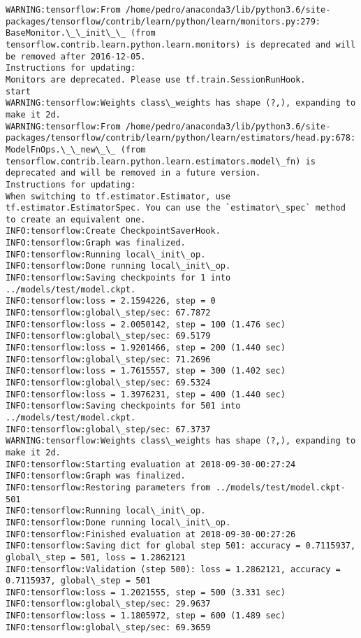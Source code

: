 \documentclass[11pt]{article}
\begin{document}
    \begin{Verbatim}[commandchars=\\\{\}]
WARNING:tensorflow:From /home/pedro/anaconda3/lib/python3.6/site-packages/tensorflow/contrib/learn/python/learn/monitors.py:279: BaseMonitor.\_\_init\_\_ (from tensorflow.contrib.learn.python.learn.monitors) is deprecated and will be removed after 2016-12-05.
Instructions for updating:
Monitors are deprecated. Please use tf.train.SessionRunHook.
start
WARNING:tensorflow:Weights class\_weights has shape (?,), expanding to make it 2d.
WARNING:tensorflow:From /home/pedro/anaconda3/lib/python3.6/site-packages/tensorflow/contrib/learn/python/learn/estimators/head.py:678: ModelFnOps.\_\_new\_\_ (from tensorflow.contrib.learn.python.learn.estimators.model\_fn) is deprecated and will be removed in a future version.
Instructions for updating:
When switching to tf.estimator.Estimator, use tf.estimator.EstimatorSpec. You can use the `estimator\_spec` method to create an equivalent one.
INFO:tensorflow:Create CheckpointSaverHook.
INFO:tensorflow:Graph was finalized.
INFO:tensorflow:Running local\_init\_op.
INFO:tensorflow:Done running local\_init\_op.
INFO:tensorflow:Saving checkpoints for 1 into ../models/test/model.ckpt.
INFO:tensorflow:loss = 2.1594226, step = 0
INFO:tensorflow:global\_step/sec: 67.7872
INFO:tensorflow:loss = 2.0050142, step = 100 (1.476 sec)
INFO:tensorflow:global\_step/sec: 69.5179
INFO:tensorflow:loss = 1.9201466, step = 200 (1.440 sec)
INFO:tensorflow:global\_step/sec: 71.2696
INFO:tensorflow:loss = 1.7615557, step = 300 (1.402 sec)
INFO:tensorflow:global\_step/sec: 69.5324
INFO:tensorflow:loss = 1.3976231, step = 400 (1.440 sec)
INFO:tensorflow:Saving checkpoints for 501 into ../models/test/model.ckpt.
INFO:tensorflow:global\_step/sec: 67.3737
WARNING:tensorflow:Weights class\_weights has shape (?,), expanding to make it 2d.
INFO:tensorflow:Starting evaluation at 2018-09-30-00:27:24
INFO:tensorflow:Graph was finalized.
INFO:tensorflow:Restoring parameters from ../models/test/model.ckpt-501
INFO:tensorflow:Running local\_init\_op.
INFO:tensorflow:Done running local\_init\_op.
INFO:tensorflow:Finished evaluation at 2018-09-30-00:27:26
INFO:tensorflow:Saving dict for global step 501: accuracy = 0.7115937, global\_step = 501, loss = 1.2862121
INFO:tensorflow:Validation (step 500): loss = 1.2862121, accuracy = 0.7115937, global\_step = 501
INFO:tensorflow:loss = 1.2021555, step = 500 (3.331 sec)
INFO:tensorflow:global\_step/sec: 29.9637
INFO:tensorflow:loss = 1.1805972, step = 600 (1.489 sec)
INFO:tensorflow:global\_step/sec: 69.3659

\end{Verbatim}
\end{document}
